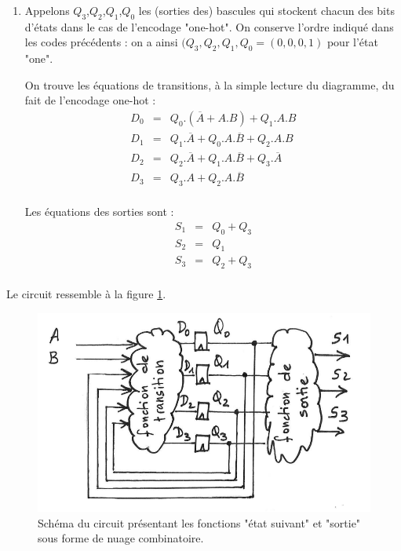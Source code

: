 \documentclass[a4paper,11pt]{article}
\begin{document}
\begin{enumerate}
\begin{table}{htp}
\end{table}

\item Appelons $Q_3$,$Q_2$,$Q_1$,$Q_0$ les (sorties des) bascules qui stockent chacun des bits d'états
dans le cas de l'encodage "one-hot". On conserve l'ordre indiqué dans les codes
précédents : on a ainsi $(Q_3,Q_2,Q_1,Q_0=(0,0,0,1)$ pour l'état "one".

On trouve les équations de transitions, à la simple lecture du diagramme, du fait de l'encodage one-hot :
$$
\begin{array}{lcl}
  D_0 & = & Q_0.(\overline{A}+A.B)+Q_1.A.B \\
  D_1 & = & Q_1.\overline{A}+Q_0.A.\overline{B}+Q_2.A.B\\
  D_2 & = & Q_2.\overline{A}+Q_1.A.\overline{B}+Q_3.\overline{A}\\
  D_3 & = & Q_3.A+Q_2.A.\overline{B}\\
\end{array}
$$

Les équations des sorties sont :
$$
\begin{array}{lcl}
  S_1 & = & Q_0+Q_3\\
  S_2 & = & Q_1\\
  S_3 & = & Q_2+Q_3\\
\end{array}
$$

\end{enumerate}

Le circuit ressemble à la figure \ref{circuit_template}.

\begin{figure}[!h]
  \begin{center}
    \includegraphics[scale=0.3]{./figures/circuit_template}
  \end{center}
  \caption{Schéma du circuit présentant les fonctions "état suivant" et "sortie" sous forme de nuage combinatoire.}
  \label{circuit_template}
\end{figure}
\end{document}
